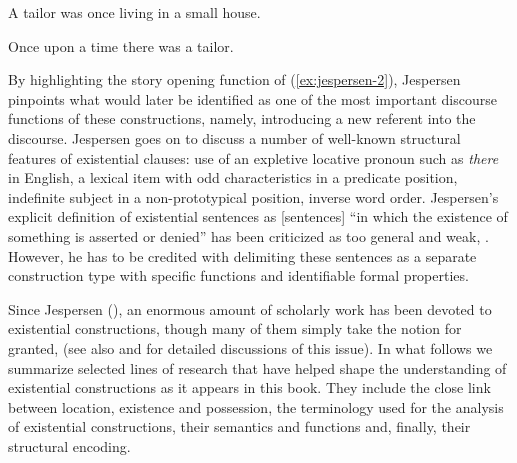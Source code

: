 \documentclass[output=paper,chinesefont,colorlinks,citecolor=brown]{langscibook}
\begin{document}
\begin{exe}\ex
    \label{ex:jespersen-1}
          A tailor was once living in a small house. \citep[154]{jespersen1924}
    \end{exe}
    
\begin{exe}\ex
    \label{ex:jespersen-2}
          Once upon a time there was a tailor. \citep[154]{jespersen1924}
    \end{exe}
By highlighting the story opening function of (\ref{ex:jespersen-2}), Jespersen pinpoints what would later be identified as one of the most important discourse functions of these constructions, namely, introducing a new referent into the discourse. Jespersen goes on to discuss a number of well-known structural features of existential clauses: use of an expletive locative pronoun such as \textit{there} in English, a lexical item with odd characteristics in a predicate position, indefinite subject in a non-prototypical position, inverse word order. Jespersen’s explicit definition of existential sentences as [sentences] “in which the existence of something is asserted or denied” has been criticized as too general and weak, \citep[212]{McNally2016}. However, he has to be credited with delimiting these sentences as a separate construction type with specific functions and identifiable formal properties.

Since Jespersen (\citeyear{jespersen1924}), an enormous amount of scholarly work has been devoted to existential constructions, though many of them simply take the notion for granted, (see also \citet[43-44]{creissels2019} and \citet{haspelmath2021} for detailed discussions of this issue). In what follows we summarize selected lines of research that have helped shape the understanding of existential constructions as it appears in this book. They include the close link between location, existence and possession, the terminology used for the analysis of existential constructions, their semantics and functions and, finally, their structural encoding.
\end{document}
